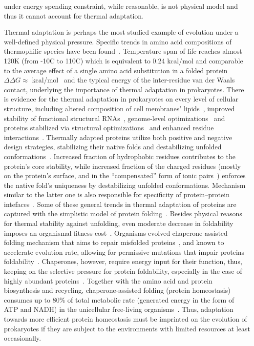 \documentclass[10pt,letterpaper]{article}
\begin{document}
under energy spending constraint, while reasonable, is not physical model and thus it cannot account for thermal adaptation.


Thermal adaptation is perhaps the most studied example of evolution under a well-defined physical pressure. Specific trends in amino acid compositions of thermophilic species have been found~\cite{Zeldovich2007Protein,Singer2003Thermophilic,Kreil2001Identification,Haney1999Thermal}. Temperature span of life reaches almost 120K (from -10\textdegree C to 110\textdegree C) which is equivalent to 0.24 kcal/mol and comparable to the average effect of a single amino acid substitution in a folded protein $\Delta\Delta G\approx$ kcal/mol~\cite{Zeldovich2007Proteinb} and the typical energy of the inter-residue van der Waals contact, underlying the importance of thermal adaptation in prokaryotes. There is evidence for the thermal adaptation in prokaryotes on every level of cellular structure, including altered composition of cell membranes' lipids~\cite{Chugunov2014Liquid}, improved stability of functional structural RNAs~\cite{Galtier1997Relationships}, genome-level optimizations~\cite{Sabath2013Growth,Saha2015Overlapping} and proteins stabilized via structural optimizations~\cite{Szilagyi2000Structural,England2003Natural} and enhanced residue interactions~\cite{Berezovsky2007Positive}. Thermally adapted proteins utilize both positive and negative design strategies, stabilizing their native folds and destabilizing unfolded conformations~\cite{Berezovsky2007Positive}. Increased fraction of hydrophobic residues contributes to the protein's core stability, while increased fraction of the charged residues (mostly on the protein's surface, and in the ``compensated'' form of ionic pairs~\cite{Szilagyi2000Structural}) enforces the native fold's uniqueness by destabilizing unfolded conformations. Mechanism similar to the latter one is also responsible for specificity of protein--protein intefaces~\cite{Zhao2011Charged}. Some of these general trends in thermal adaptation of proteins are captured with the simplistic model of protein folding~\cite{Berezovsky2007Positive}. Besides physical reasons for thermal stability against unfolding, even moderate decrease in foldability imposes an organismal fitness cost~\cite{Drummond2008MistranslationInduced,Samerotte2011Misfolded}. Organisms evolved chaperone-assisted folding mechanism that aims to repair misfolded proteins~\cite{Hartl2011Molecular}, and known to accelerate evolution rate, allowing for permissive mutations that impair proteins foldability~\cite{Cetinbas2013Catalysis}. Chaperones, however, require energy input for their function, thus, keeping on the selective pressure for protein foldability, especially in the case of highly abundant proteins~\cite{Kepp2014Model}. Together with the amino acid and protein biosynthesis and recycling, chaperone-assisted folding (protein homeostasis) consumes up to 80\% of total metabolic rate (generated energy in the form of ATP and NADH) in the unicellular free-living organisms~\cite{Kepp2014Model}. Thus, adaptation towards more efficient protein homeostasis must be imprinted on the evolution of prokaryotes if they are subject to the environments with limited resources at least occasionally.
\end{document}
